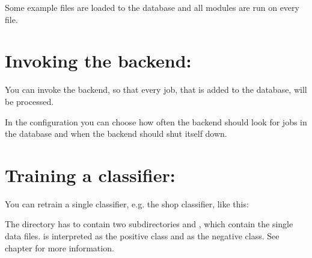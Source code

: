 \documentclass[letterpaper,10pt,english]{sphinxmanual}
\begin{document}
%
\begin{sphinxVerbatim}[commandchars=\\\{\}]
   
\end{sphinxVerbatim}

Some example files are loaded to the database and all modules are run
on every file.


\section{Invoking the backend:}
\label{\detokenize{tutorial:invoking-the-backend}}
You can invoke the backend, so that every job, that is added to the
database, will be processed.

%
\begin{sphinxVerbatim}[commandchars=\\\{\}]
  
\end{sphinxVerbatim}

In the configuration you can choose how often the backend should look
for jobs in the database and when the backend should shut itself down.


\section{Training a classifier:}
\label{\detokenize{tutorial:training-a-classifier}}
You can retrain a single classifier, e.g. the shop classifier, like
this:

%
\begin{sphinxVerbatim}[commandchars=\\\{\}]
    
\end{sphinxVerbatim}

The directory  has to contain two subdirectories
 and , which contain the single data
files.  is interpreted as the positive class and  as
the negative class. See chapter {\hyperref[\detokenize{training:training}]{}} for more information.
\end{document}
